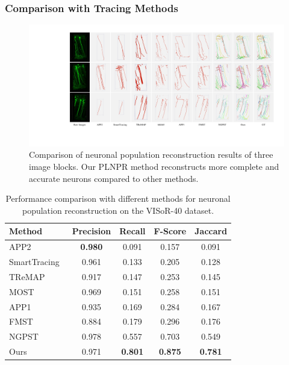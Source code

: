\subsubsection{Comparison with Tracing Methods}



\begin{figure}[t]
	\centering
	\includegraphics[width=1\textwidth]{./Illustrations/iteration3.pdf}
	\caption{Comparison of neuronal population reconstruction results of three image blocks. %
Our PLNPR method reconstructs more complete and accurate neurons compared to other methods. 
	}
	\label{fig:compare_VISoR}
\end{figure}



\begin{table}[th]
	\centering
	\caption{Performance comparison with different methods for neuronal population reconstruction on the VISoR-40 dataset.}
	\label{table:compare_VISoR}
	\begin{tabular}{lcccc}
		\toprule
		Method & Precision & Recall & F-Score & Jaccard\\
		\midrule
		APP2~\cite{Xiao2013}
		& \textbf{0.980} & 0.091 & 0.157 & 0.091\\
		SmartTracing~\cite{Chen2015}
		& 0.961 & 0.133 & 0.205 & 0.128\\
		TReMAP~\cite{Zhou2016}
		& 0.917 & 0.147 & 0.253 & 0.145\\
		MOST~\cite{Wu2014}          
		& 0.969 & 0.151& 0.258& 0.151\\
		APP1~\cite{Peng2011}
		& 0.935 & 0.169 & 0.284 & 0.167\\
		FMST~\cite{Yang2019}
		& 0.884 & 0.179 & 0.296 &  0.176\\
		NGPST~\cite{Quan2015}
		& 0.978 & 0.557& 0.703 & 0.549\\
		\midrule
		Ours
		& 0.971 & \textbf{0.801}&\textbf{0.875} & \textbf{0.781}\\
		\bottomrule
	\end{tabular}
\end{table}

